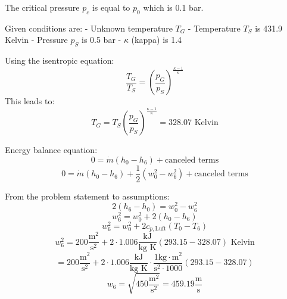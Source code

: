 The critical pressure \( p_c \) is equal to \( p_0 \) which is 0.1 bar.

Given conditions are:
- Unknown temperature \( T_G \)
- Temperature \( T_S \) is 431.9 Kelvin
- Pressure \( p_S \) is 0.5 bar
- \( \kappa \) (kappa) is 1.4

Using the isentropic equation:
\[
\frac{T_G}{T_S} = \left( \frac{p_G}{p_S} \right)^{\frac{\kappa - 1}{\kappa}}
\]
This leads to:
\[
T_G = T_S \left( \frac{p_G}{p_S} \right)^{\frac{\kappa - 1}{\kappa}} = 328.07 \text{ Kelvin}
\]

Energy balance equation:
\[
0 = \dot{m} (h_0 - h_6) + \text{canceled terms}
\]
\[
0 = \dot{m} (h_0 - h_6) + \frac{1}{2} (w_0^2 - w_6^2) + \text{canceled terms}
\]

From the problem statement to assumptions:
\[
2(h_6 - h_0) = w_0^2 - w_6^2
\]
\[
w_6^2 = w_0^2 + 2(h_0 - h_6)
\]
\[
w_6^2 = w_0^2 + 2 c_{p,\text{Luft}} (T_0 - T_6)
\]
\[
w_6^2 = 200 \frac{\text{m}^2}{\text{s}^2} + 2 \cdot 1.006 \frac{\text{kJ}}{\text{kg K}} (293.15 - 328.07) \text{ Kelvin}
\]
\[
= 200 \frac{\text{m}^2}{\text{s}^2} + 2 \cdot 1.006 \frac{\text{kJ}}{\text{kg K}} \cdot \frac{1 \text{kg} \cdot \text{m}^2}{\text{s}^2 \cdot 1000} (293.15 - 328.07)
\]
\[
w_6 = \sqrt{450 \frac{\text{m}^2}{\text{s}^2}} = 459.19 \frac{\text{m}}{\text{s}}
\]